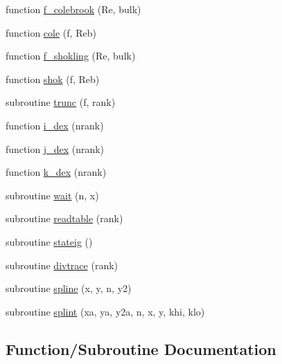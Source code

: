 \begin{DoxyCompactItemize}
\item 
function \hyperlink{main__comp_8f_a101cc571e6df94902bbcd02e4b448fa2}{f\+\_\+colebrook} (Re, bulk)
\item 
function \hyperlink{main__comp_8f_afdc95f0ccfbe5834e390697a1f6e2321}{cole} (f, Reb)
\item 
function \hyperlink{main__comp_8f_ad0b949695373696aebb05bf260a06b37}{f\+\_\+shokling} (Re, bulk)
\item 
function \hyperlink{main__comp_8f_a74177647a3929a8e8d9b3f9c5f755ebc}{shok} (f, Reb)
\item 
subroutine \hyperlink{main__comp_8f_ac4190cdd366072ce20c098057d3c4791}{trunc} (f, rank)
\item 
function \hyperlink{main__comp_8f_aab520fa96ca8f81a40061c15a5584edc}{i\+\_\+dex} (nrank)
\item 
function \hyperlink{main__comp_8f_a2906675ed80ec863f852ee5a335b9cee}{j\+\_\+dex} (nrank)
\item 
function \hyperlink{main__comp_8f_acfffc05e4852c3322cca7524f07d70c1}{k\+\_\+dex} (nrank)
\item 
subroutine \hyperlink{main__comp_8f_a660fa5c3eadf21e849173b15155f0f7f}{wait} (n, x)
\item 
subroutine \hyperlink{main__comp_8f_aced8587c0328a1d906084b41c002acaf}{readtable} (rank)
\item 
subroutine \hyperlink{main__comp_8f_a6c1fee4a0aa7778d40363e660983778a}{stateig} ()
\item 
subroutine \hyperlink{main__comp_8f_a1f0f718458d4d9d49d1c904b55cc6437}{divtrace} (rank)
\item 
subroutine \hyperlink{main__comp_8f_a27351a74d7ab14c93a1bedc697c2458f}{spline} (x, y, n, y2)
\item 
subroutine \hyperlink{main__comp_8f_acdf98afdf96c50e02807522a249b9a85}{splint} (xa, ya, y2a, n, x, y, khi, klo)
\end{DoxyCompactItemize}


\subsection{Function/\+Subroutine Documentation}
\mbox{\label{main__comp_8f_a4643d5614804288ace9a9914cda6ed97}} 
